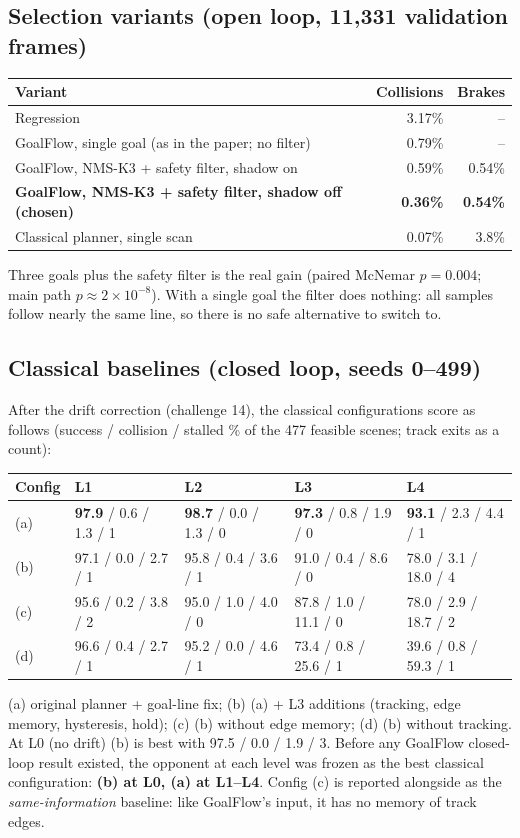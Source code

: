 \documentclass[11pt,a4paper]{article}
\begin{document}
\subsection{Selection variants (open loop, 11{,}331 validation frames)}
\begin{table}[h]
\small
\begin{tabularx}{\linewidth}{@{}Lrr@{}}
\toprule
Variant & Collisions & Brakes \\
\midrule
Regression & 3.17\% & -- \\
GoalFlow, single goal (as in the paper; no filter) & 0.79\% & -- \\
GoalFlow, NMS-K3 + safety filter, shadow on & 0.59\% & 0.54\% \\
\textbf{GoalFlow, NMS-K3 + safety filter, shadow off (chosen)} & \textbf{0.36\%} & \textbf{0.54\%} \\
Classical planner, single scan & 0.07\% & 3.8\% \\
\bottomrule
\end{tabularx}
\end{table}
Three goals plus the safety filter is the real gain (paired McNemar $p=0.004$; main path $p\approx2\times10^{-8}$).
With a single goal the filter does nothing: all samples follow nearly the same line, so there is no safe
alternative to switch to.

\subsection{Classical baselines (closed loop, seeds 0--499)}
After the drift correction (challenge 14), the classical configurations score as follows (success / collision /
stalled \% of the 477 feasible scenes; track exits as a count):
\begin{table}[H]
\footnotesize
\begin{tabular}{@{}lllll@{}}
\toprule
Config & L1 & L2 & L3 & L4 \\
\midrule
(a) & \textbf{97.9} / 0.6 / 1.3 / 1 & \textbf{98.7} / 0.0 / 1.3 / 0 & \textbf{97.3} / 0.8 / 1.9 / 0 & \textbf{93.1} / 2.3 / 4.4 / 1 \\
(b) & 97.1 / 0.0 / 2.7 / 1 & 95.8 / 0.4 / 3.6 / 1 & 91.0 / 0.4 / 8.6 / 0 & 78.0 / 3.1 / 18.0 / 4 \\
(c) & 95.6 / 0.2 / 3.8 / 2 & 95.0 / 1.0 / 4.0 / 0 & 87.8 / 1.0 / 11.1 / 0 & 78.0 / 2.9 / 18.7 / 2 \\
(d) & 96.6 / 0.4 / 2.7 / 1 & 95.2 / 0.0 / 4.6 / 1 & 73.4 / 0.8 / 25.6 / 1 & 39.6 / 0.8 / 59.3 / 1 \\
\bottomrule
\end{tabular}
\end{table}
(a) original planner + goal-line fix; (b) (a) + L3 additions (tracking, edge memory, hysteresis, hold); (c) (b)
without edge memory; (d) (b) without tracking.
At L0 (no drift) (b) is best with 97.5 / 0.0 / 1.9 / 3. Before any GoalFlow closed-loop result existed, the
opponent at each level was frozen as the best classical configuration: \textbf{(b) at L0, (a) at L1--L4}. Config
(c) is reported alongside as the \emph{same-information} baseline: like GoalFlow's input, it has no memory of track
edges.
\end{document}
